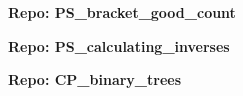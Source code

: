 \documentclass[handout]{mcs}
\begin{document}

\newcommand{\fbt}{\text{FBT}}
\newcommand{\wlt}{\text{WLT}}
\newcommand{\tg}{\text{2PTG}}
\newcommand{\vg}{\text{VG}}


\large\textbf{Repo: PS\_bracket\_good\_count}

\large\textbf{Repo: PS\_calculating\_inverses}



\large\textbf{Repo: CP\_binary\_trees}
\end{document}
